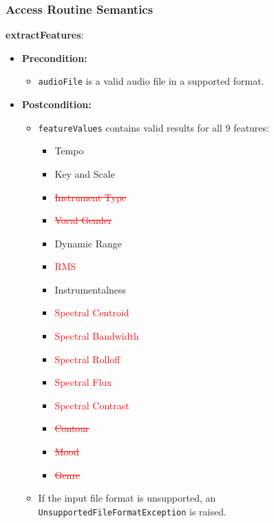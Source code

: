 \documentclass[12pt, titlepage]{article}
\begin{document}
\subsubsection{Access Routine Semantics}
\textbf{extractFeatures}:
\begin{itemize}
    \item \textbf{Precondition:} 
    \begin{itemize}
        \item \texttt{audioFile} is a valid audio file in a supported format.
    \end{itemize}
    \item \textbf{Postcondition:}
    \begin{itemize}
        \item \texttt{featureValues} contains valid results for all 9 features:
            \begin{itemize}
                \item Tempo
                \item Key and Scale
                \item \textcolor{red}{\sout{Instrument Type}}
                \item \textcolor{red}{\sout{Vocal Gender}}
                \item Dynamic Range
                \item \textcolor{red}{RMS}
                \item Instrumentalness
                \item \textcolor{red}{Spectral Centroid}
                \item \textcolor{red}{Spectral Bandwidth}
                \item \textcolor{red}{Spectral Rolloff}
                \item \textcolor{red}{Spectral Flux}
                \item \textcolor{red}{Spectral Contrast}
                \item \textcolor{red}{\sout{Contour}}
                \item \textcolor{red}{\sout{Mood}}
                \item \textcolor{red}{\sout{Genre}}
            \end{itemize}
        \item If the input file format is unsupported, an \texttt{UnsupportedFileFormatException} is raised.
    \end{itemize}
\end{itemize}
\end{document}
